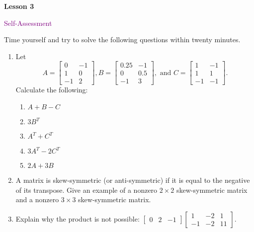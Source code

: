 \documentclass[10pt]{book}
\theoremstyle{definition}
\theoremstyle{remark}
\begin{document}
\begin{tcolorbox}[
  width=\textwidth,
  colback=gray!10, %
  colframe=white, %
  boxrule=0pt,    %
  left=1cm,       %
  right=1cm,      %
  sharp corners  %
]

\begin{minipage}[t]{0.5\textwidth}
  \Huge \textbf{Lesson 3}
\end{minipage}%
\hfill
\begin{minipage}[t]{0.5\textwidth}
  \Huge\textcolor{purple}{Self-Assessment}
\end{minipage}
\end{tcolorbox}

\begin{large}
\noindent
Time yourself and try to solve the following questions within twenty minutes. 
\begin{enumerate}
\item Let \[A = \begin{bmatrix} 0 & -1 \\ 1 & 0 \\ -1 & 2 \end{bmatrix}, B = \begin{bmatrix} 0.25 & -1 \\ 0 & 0.5 \\ -1 & 3 \end{bmatrix}, \text{ and } C = \begin{bmatrix} 1 & -1 \\ 1 & 1 \\ -1 & -1 \end{bmatrix}.\]  Calculate the following:
\begin{multicols}{2}
\begin{enumerate}
	\item  $A + B-C$ 
	\item  $3B^T$ 
	\item  $A^T + C^T$ 
	\item  $3A^T - 2C^T$ 
	\item  $2A + 3B$ 
\end{enumerate}\end{multicols} \vfil
\item A matrix is skew-symmetric (or anti-symmetric) if it is equal to the negative of its transpose. Give an example of a nonzero $2 \times 2$ skew-symmetric matrix and a nonzero $3 \times 3$ skew-symmetric matrix.\vfil
\item Explain why the product is not possible: $\begin{bmatrix} 0&2&-1 \end{bmatrix} \begin{bmatrix}1 & -2 & 1\\ -1 & -2 & 11 \end{bmatrix}.$\vfil\vfil

\end{enumerate}
\end{large}
\end{document}

